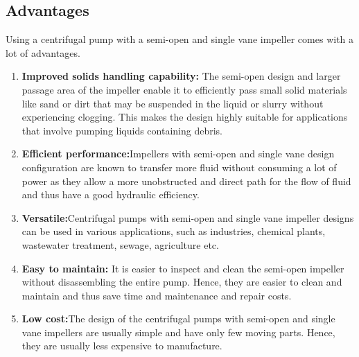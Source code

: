 \documentclass[11pt,a4paper]{scrartcl}
\begin{document}
\subsection{Advantages}
Using a centrifugal pump with a semi-open and single vane impeller comes with a lot of advantages.
\begin{enumerate}
        \item \textbf{Improved solids handling capability:} The semi-open design and larger passage area of the impeller enable it to efficiently pass small solid materials like sand or dirt that may be suspended in the liquid or slurry without experiencing clogging. This makes the design highly suitable for applications that involve pumping liquids containing debris.

        \item \textbf{Efficient performance:}Impellers with semi-open and single vane design configuration are known to transfer more fluid without consuming a lot of power as they allow a more unobstructed and direct path for the flow of fluid and thus have a good hydraulic efficiency. 
        \item \textbf{Versatile:}Centrifugal pumps with semi-open and single vane impeller designs can be used in various applications, such as industries, chemical plants, wastewater treatment, sewage, agriculture etc.
        \item \textbf{Easy to maintain:} It is easier to inspect and clean the semi-open impeller without disassembling the entire pump. Hence, they are easier to clean and maintain and thus save time and maintenance and repair costs.
        \item \textbf{Low cost:}The design of the centrifugal pumps with semi-open and single vane impellers are usually simple and have only few moving parts. Hence, they are usually less expensive to manufacture.
 
\end{enumerate}
\end{document}
